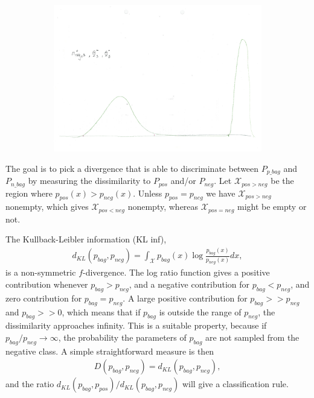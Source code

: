 \begin{figure}[!h]
\begin{subfigure}{}
  \end{subfigure}
  \begin{subfigure}{}
    \includegraphics[height = 0.3\textheight]{Figures/neg.pdf}
  \end{subfigure}
\end{figure}

The goal is to pick a divergence that is able to discriminate between $P_{p \_ bag}$ and $P_{n \_ bag}$ by measuring the dissimilarity to $P_{pos}$ and/or $P_{neg}$.
Let $\mathcal{X}_{pos > neg}$ be the region where $p_{pos}(x) > p_{neg}(x)$. 
Unless $p_{pos} = p_{neg}$ we have $\mathcal{X}_{pos > neg}$ nonempty, which gives $\mathcal{X}_{pos < neg}$ nonempty, whereas $\mathcal{X}_{pos = neg}$ might be empty or not. 

The Kullback-Leibler information (KL inf),
\begin{align}
  d_{KL}(p_{bag},p_{neg}) = \int_\mathcal{X} p_{bag}(x) \log \frac{p_{bag}(x)}{p_{neg}(x)} dx,
\end{align}
is a non-symmetric $f$-divergence.
The log ratio function gives a positive contribution whenever $p_{bag}>p_{neg}$, and a negative contribution for $p_{bag}<p_{neg}$, and zero contribution for $p_{bag} = p_{neg}$.
A large positive contribution for $p_{bag} >> p_{neg}$ and $p_{bag} >> 0$, which means that if $p_{bag}$ is outside the range of $p_{neg}$, the dissimilarity approaches infinity. 
This is a suitable property, because if $p_{bag}/p_{neg} \rightarrow \infty$, the probability the parameters of $p_{bag}$ are not sampled from the negative class. 
A simple straightforward measure is then
\begin{align}
  D(p_{bag},p_{neg}) = d_{KL} (p_{bag},p_{neg}),
\end{align}
and the ratio $d_{KL} (p_{bag},p_{pos})/d_{KL} (p_{bag},p_{neg})$ will give a classification rule.

